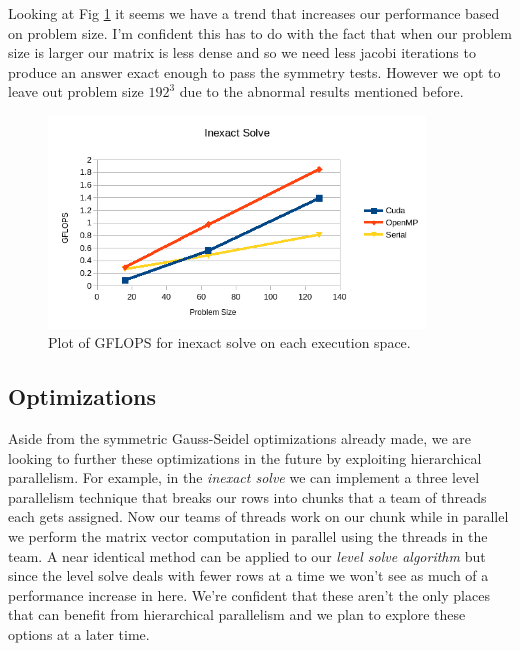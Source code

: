\documentclass{ccr15}
\begin{document}
Looking at Fig \ref{Inexact} it seems we have a trend that increases our performance based on
problem size. I'm confident this has to do with the fact that when our problem size is larger our
matrix is less dense and so we need less jacobi iterations to produce an answer exact enough to
pass the symmetry tests. However we opt to leave out problem size $192^3$ due to the abnormal
results mentioned before.

\begin{figure}[H]
	\centering
	\includegraphics[width=10cm]{plots/ZAB-InexactSolve.png}
	\caption{Plot of GFLOPS for inexact solve on each execution space.}
	\label{Inexact}
\end{figure}

\subsection{Optimizations}
Aside from the symmetric Gauss-Seidel optimizations already made, we are looking to further these
optimizations in the future by exploiting hierarchical parallelism. For example, in the \emph{inexact
solve} we can implement a three level parallelism technique that breaks our rows into chunks that 
a team of threads each gets assigned. Now our teams of threads work on our chunk while in
parallel we perform the matrix vector computation in parallel using the threads in the team. A
near identical method can be applied to our \emph{level solve algorithm} but since the level solve deals
with fewer rows at a time we won't see as much of a performance increase in here. We're confident
that these aren't the only places that can benefit from hierarchical parallelism and we plan to
explore these options at a later time.
\end{document}
